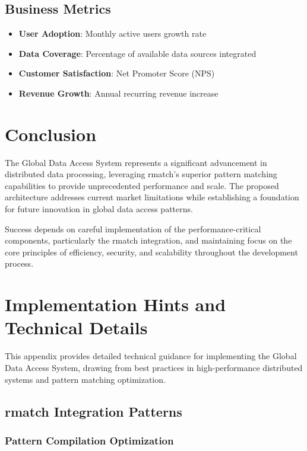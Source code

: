 \documentclass[11pt,a4paper]{article}
\begin{document}
\subsection{Business Metrics}
\begin{itemize}
\item \textbf{User Adoption}: Monthly active users growth rate
\item \textbf{Data Coverage}: Percentage of available data sources integrated
\item \textbf{Customer Satisfaction}: Net Promoter Score (NPS)
\item \textbf{Revenue Growth}: Annual recurring revenue increase
\end{itemize}

\section{Conclusion}

The Global Data Access System represents a significant advancement in distributed data processing, leveraging rmatch's superior pattern matching capabilities to provide unprecedented performance and scale. The proposed architecture addresses current market limitations while establishing a foundation for future innovation in global data access patterns.

Success depends on careful implementation of the performance-critical components, particularly the rmatch integration, and maintaining focus on the core principles of efficiency, security, and scalability throughout the development process.

\newpage
\appendix

\section{Implementation Hints and Technical Details}

This appendix provides detailed technical guidance for implementing the Global Data Access System, drawing from best practices in high-performance distributed systems and pattern matching optimization.

\subsection{rmatch Integration Patterns}

\subsubsection{Pattern Compilation Optimization}
\end{document}
